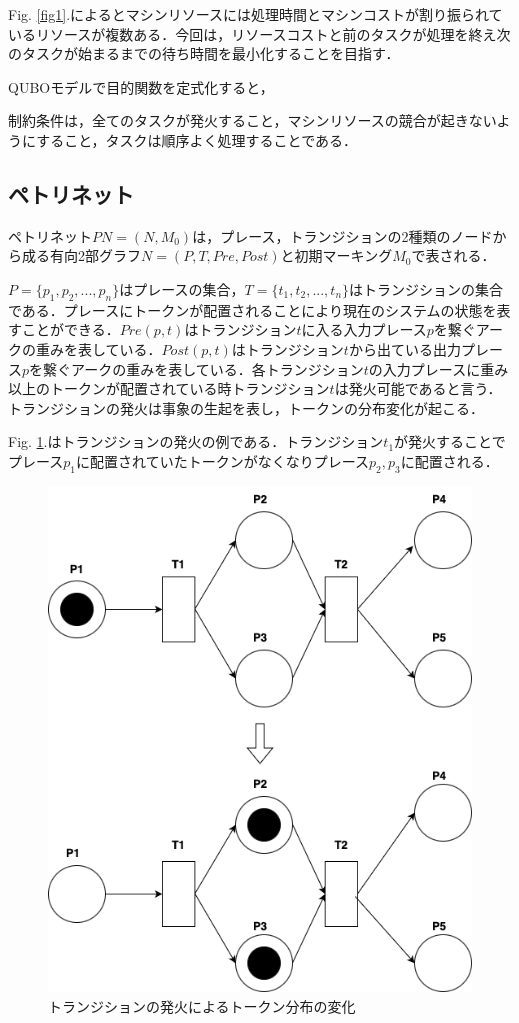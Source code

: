 \documentclass[conference]{IEEEtran}
\begin{document}
Fig. \ref{fig1}.によるとマシンリソースには処理時間とマシンコストが割り振られているリソースが複数ある．今回は，リソースコストと前のタスクが処理を終え次のタスクが始まるまでの待ち時間を最小化することを目指す．

QUBOモデルで目的関数を定式化すると，

制約条件は，全てのタスクが発火すること，マシンリソースの競合が起きないようにすること，タスクは順序よく処理することである．


\subsection{ペトリネット}
ペトリネット$PN = (N,M_0)$は，プレース，トランジションの2種類のノードから成る有向2部グラフ$N = (P,T,Pre,Post)$と初期マーキング$M_0$で表される．\cite{b2}

$P = \{p_1,p_2,...,p_n\}$はプレースの集合，$T = \{t_1,t_2,...,t_n\}$はトランジションの集合である．プレースにトークンが配置されることにより現在のシステムの状態を表すことができる．$Pre(p,t)$はトランジション$t$に入る入力プレース$p$を繋ぐアークの重みを表している．$Post(p,t)$はトランジション$t$から出ている出力プレース$p$を繋ぐアークの重みを表している．各トランジション$t$の入力プレースに重み以上のトークンが配置されている時トランジション$t$は発火可能であると言う．トランジションの発火は事象の生起を表し，トークンの分布変化が起こる．

Fig. \ref{fig2}.はトランジションの発火の例である．トランジション$t_1$が発火することでプレース$p_1$に配置されていたトークンがなくなりプレース$p_2,p_3$に配置される．

\begin{figure}[htbp]
\centerline{\includegraphics[scale=0.3]{./fig/fire.pdf}}
\caption{トランジションの発火によるトークン分布の変化}
\label{fig2}
\end{figure}
\end{document}
